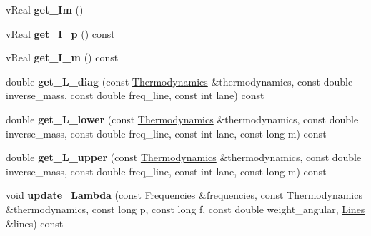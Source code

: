 \begin{DoxyCompactItemize}
v\+Real {\bfseries get\+\_\+\+Im} ()
\item 
\mbox{\label{structRayPair_a96f3d8e41ce1a210be44a5bbec2bed0b}} 
v\+Real {\bfseries get\+\_\+\+I\+\_\+p} () const
\item 
\mbox{\label{structRayPair_a5e925be3d1d2184d31a4f978c618df44}} 
v\+Real {\bfseries get\+\_\+\+I\+\_\+m} () const
\item 
\mbox{\label{structRayPair_a811cf18e0f5401ae9dee6e1bfe4f03eb}} 
double {\bfseries get\+\_\+\+L\+\_\+diag} (const \mbox{\hyperlink{structThermodynamics}{Thermodynamics}} \&thermodynamics, const double inverse\+\_\+mass, const double freq\+\_\+line, const int lane) const
\item 
\mbox{\label{structRayPair_a313378a90dc0a63df52281b5becfeaac}} 
double {\bfseries get\+\_\+\+L\+\_\+lower} (const \mbox{\hyperlink{structThermodynamics}{Thermodynamics}} \&thermodynamics, const double inverse\+\_\+mass, const double freq\+\_\+line, const int lane, const long m) const
\item 
\mbox{\label{structRayPair_a1c7858e737ddf3204e2f77cdc9d2ac07}} 
double {\bfseries get\+\_\+\+L\+\_\+upper} (const \mbox{\hyperlink{structThermodynamics}{Thermodynamics}} \&thermodynamics, const double inverse\+\_\+mass, const double freq\+\_\+line, const int lane, const long m) const
\item 
\mbox{\label{structRayPair_a2024d05b8ffe51d56611d28b6af8269c}} 
void {\bfseries update\+\_\+\+Lambda} (const \mbox{\hyperlink{structFrequencies}{Frequencies}} \&frequencies, const \mbox{\hyperlink{structThermodynamics}{Thermodynamics}} \&thermodynamics, const long p, const long f, const double weight\+\_\+angular, \mbox{\hyperlink{structLines}{Lines}} \&lines) const
\end{DoxyCompactItemize}

